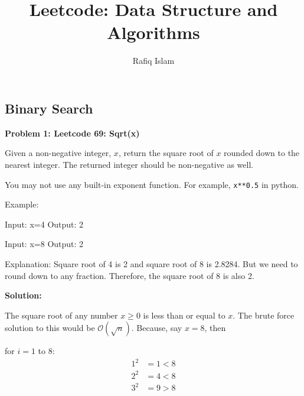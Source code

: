\documentclass[
  letterpaper,
  DIV=11,
  numbers=noendperiod]{scrartcl}
\title{Leetcode: Data Structure and Algorithms}
\author{Rafiq Islam}
\date{}
\newenvironment{Shaded}{\begin{snugshade}}{\end{snugshade}}
\newcommand{\DecValTok}[1]{\textcolor[rgb]{0.68,0.00,0.00}{#1}}
\newcommand{\NormalTok}[1]{\textcolor[rgb]{0.00,0.23,0.31}{#1}}
\newcommand{\OperatorTok}[1]{\textcolor[rgb]{0.37,0.37,0.37}{#1}}
\renewcommand*\contentsname{Table of contents}
\newcommand\contentsname{Table of contents}
\begin{document}
\maketitle

\renewcommand*\contentsname{Table of contents}
{
\setcounter{tocdepth}{4}
\tableofcontents
}

\subsection{Binary Search}\label{binary-search}

\begin{tcolorbox}[enhanced jigsaw, arc=.35mm, bottomrule=.15mm, breakable, colback=white, colframe=quarto-callout-note-color-frame, left=2mm, leftrule=.75mm, opacityback=0, rightrule=.15mm, toprule=.15mm]

\vspace{-3mm}\textbf{Problem 1: Leetcode 69: Sqrt(x)}\vspace{3mm}

Given a non-negative integer, \(x\), return the square root of \(x\)
rounded down to the nearest integer. The returned integer should be
non-negative as well.

You may not use any built-in exponent function. For example,
\texttt{x**0.5} in python.

Example:

\begin{Shaded}
\begin{Highlighting}[]
\NormalTok{Input: x}\OperatorTok{=}\DecValTok{4}
\NormalTok{Output: }\DecValTok{2}  

\NormalTok{Input: x}\OperatorTok{=}\DecValTok{8}
\NormalTok{Output: }\DecValTok{2}
\end{Highlighting}
\end{Shaded}

Explanation: Square root of 4 is 2 and square root of 8 is 2.8284. But
we need to round down to any fraction. Therefore, the square root of 8
is also 2.

\textbf{Solution:}

The square root of any number \(x\ge 0\) is less than or equal to \(x\).
The brute force solution to this would be \(\mathcal{O}(\sqrt{n})\).
Because, say \(x=8\), then

for \(i=1\) to 8: \begin{align*}
  1^2 & = 1 <8 \\
  2^2 & = 4 <8\\
  3^2 & = 9 >8
\end{align*}


\end{tcolorbox}
\end{document}
